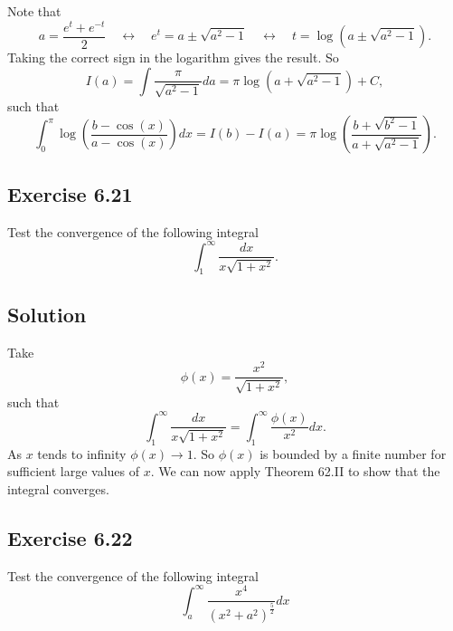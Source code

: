 Note that
\begin{equation*}
    a = \frac{e^t + e^{-t}}{2}
        \quad \leftrightarrow \quad e^t = a \pm \sqrt{a^2 - 1}
        \quad \leftrightarrow \quad t = \log(a \pm \sqrt{a^2 - 1}).
\end{equation*}
Taking the correct sign in the logarithm gives the result.
So
\begin{equation*}
    I(a) = \int \frac{\pi}{\sqrt{a^2 - 1}} da = \pi \log\left(a + \sqrt{a^2 - 1}\right) + C,
\end{equation*}
such that
\begin{equation*}
    \int_0^\pi \log\left(\frac{b - \cos(x)}{a - \cos(x)} \right) dx
        = I(b) - I(a)
        = \pi \log\left( \frac{b + \sqrt{b^2 - 1}}{a + \sqrt{a^2 - 1}} \right).
\end{equation*}


\subsection*{Exercise 6.21}

Test the convergence of the following integral
\begin{equation*}
    \int_1^{\infty} \frac{dx}{x\sqrt{1 + x^2}}.
\end{equation*}

\subsection*{Solution}

Take
\begin{equation*}
    \phi(x) = \frac{x^2}{\sqrt{1 + x^2}},
\end{equation*}
such that
\begin{equation*}
    \int_1^{\infty} \frac{dx}{x\sqrt{1 + x^2}} = \int_1^{\infty} \frac{\phi(x)}{x^2} dx.
\end{equation*}
As $x$ tends to infinity $\phi(x) \to 1$.
So $\phi(x)$ is bounded by a finite number for sufficient large values of $x$.
We can now apply Theorem 62.II to show that the integral converges.


\subsection*{Exercise 6.22}

Test the convergence of the following integral
\begin{equation*}
    \int_a^{\infty} \frac{x^4}{(x^2 + a^2)^{\frac{5}{2}}} dx
\end{equation*}

